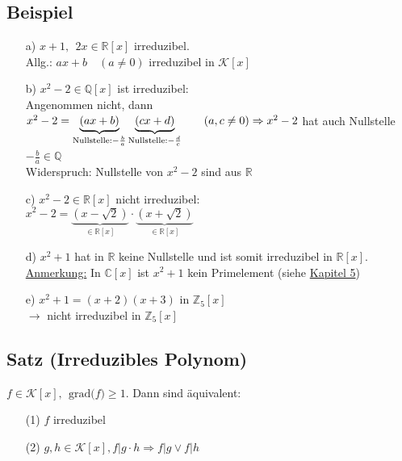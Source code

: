 \documentclass[a4paper, 12pt,titlepage, pdf, headsepline]{article}
\newcommand{\grad}[1]{\textrm{grad(}#1\textrm{)}}
\newcommand{\R}{\mathds{R}}
\newcommand{\K}{\mathcal{K}}
\newcommand{\uline}[1]{\underline{#1}}
\renewcommand{\>}{\rightarrow}
\renewcommand{\*}{\cdot}
\begin{document}
		      	\subsection{Beispiel}
		      	\begin{itemize}
		      		\item[a)]
		      		      $x+1,~~ 2x \in \R[x]$ irreduzibel.\\
		      		      Allg.: $ax +b \quad (a\neq 0)$ irreduzibel in $\K[x]$
		      		\item[b)]
		      		      $x^2 - 2 \in \mathds{Q}[x]$ ist irreduzibel: \\
		      		      Angenommen nicht, dann $x^2 - 2 = \underbrace{(ax + b)}_{\text{Nullstelle:} -\frac{b}{a}} \underbrace{(cx+d)}_{\text{Nullstelle:} -\frac{d}{c}}\qquad(a,c\neq0) \\
		      		      \Rightarrow x^2 -2$ hat auch Nullstelle $-\frac{b}{a} \in \mathds{Q}$~\Lightning\\
		      		      Widerspruch: Nullstelle von $x^2 -2$ sind aus $\R$
		      		\item[c)] $x^2 -2 \in \R[x]$ nicht irreduzibel: \\
		      		      $x^2 - 2 = \underbrace{(x-\sqrt{2})}_{\in \R[x]} \cdot \underbrace{(x+\sqrt{2})}_{\in \R[x]}$
		      		\item[d)] $x^2+1$ hat in $\R$ keine Nullstelle und ist somit irreduzibel in $\R[x]$. \\
		      		      \uline{Anmerkung:} In $\mathds{C}[x]$ ist $x^2 +1$ kein Primelement (siehe \hyperref[5]{Kapitel 5})
		      		\item[e)]
		      		      $x^2 +1 = (x+2)(x+3)$ in $\mathds{Z}_5[x]$\\
		      		      $\rightarrow$ nicht irreduzibel in $\mathds{Z}_5[x]$ 
		      	\end{itemize}
		      	\subsection{Satz (Irreduzibles Polynom)}
		      	$f \in \K[x], ~~\grad{f} \geq 1$. Dann sind äquivalent: 
		      	\begin{itemize}
		      		\item[(1)] $f$ irreduzibel
		      		\item[(2)] $g,h \in \K[x], f \vert g\cdot h \Rightarrow f \vert g \lor f\vert h$
		      	\end{itemize}
\end{document}

